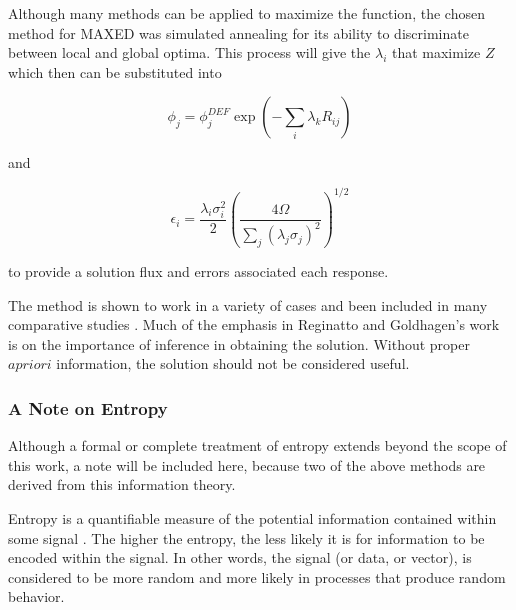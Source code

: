 \noindent
Although many methods can be applied to maximize the function, the chosen method for MAXED was simulated annealing for its ability to discriminate between local and global optima.
This process will give the $\lambda_i$ that maximize $Z$ which then can be substituted into

\begin{equation}
\label{eqn:maxed-flux}
\phi_j = \phi_j^{DEF} \exp(- \sum_i \lambda_k R_{ij})
\end{equation}

\noindent
and

\begin{equation}
\label{eqn:maxed-error}
\epsilon_i = \frac{\lambda_i \sigma_i^2}{2} (\frac{4 \Omega}{\sum_j (\lambda_j \sigma_j)^2})^{1/2}
\end{equation}

\noindent
to provide a solution flux and errors associated each response.

The method is shown to work in a variety of cases and been included in many comparative studies \cite{mazrou2016neutron}.
Much of the emphasis in Reginatto and Goldhagen's work is on the importance of inference in obtaining the solution.
Without proper $a priori$ information, the solution should not be considered useful.


\subsubsection{A Note on Entropy}
Although a formal or complete treatment of entropy extends beyond the scope of this work, a note will be included here, because two of the above methods are derived from this information theory.

Entropy is a quantifiable measure of the potential information contained within some signal \cite{guiasu1985principle}.
The higher the entropy, the less likely it is for information to be encoded within the signal.
In other words, the signal (or data, or vector), is considered to be more random and more likely in processes that produce random behavior.


